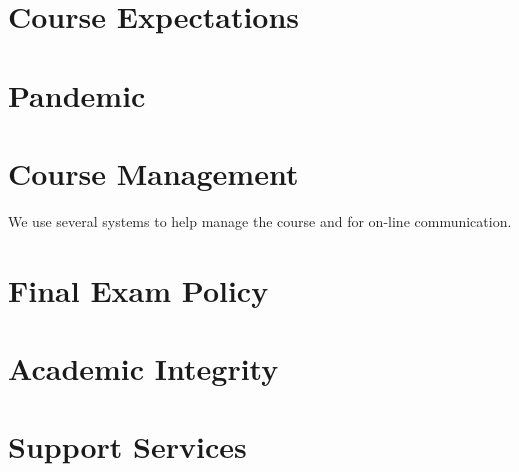 \documentclass[11pt]{article}
\begin{document}
\section{Course Expectations}



\section{Pandemic}



\section{Course Management}

We use several systems to help manage the course
and for on-line communication.





\section{Final Exam Policy}



\section{Academic Integrity}



\section{Support Services}



\lastupdated
\end{document}

